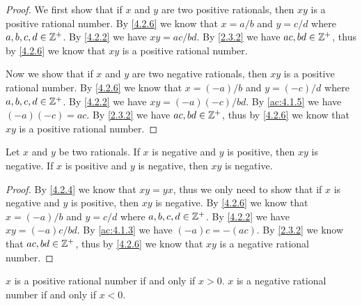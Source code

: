 \begin{proof}
  We first show that if \(x\) and \(y\) are two positive rationals, then \(xy\) is a positive rational number.
  By \cref{4.2.6} we know that \(x = a / b\) and \(y = c / d\) where \(a, b, c, d \in \mathbb{Z}^+\).
  By \cref{4.2.2} we have \(xy = ac / bd\).
  By \cref{2.3.2} we have \(ac, bd \in \mathbb{Z}^+\), thus by \cref{4.2.6} we know that \(xy\) is a positive rational number.

  Now we show that if \(x\) and \(y\) are two negative rationals, then \(xy\) is a positive rational number.
  By \cref{4.2.6} we know that \(x = (-a) / b\) and \(y = (-c) / d\) where \(a, b, c, d \in \mathbb{Z}^+\).
  By \cref{4.2.2} we have \(xy = (-a)(-c) / bd\).
  By \cref{ac:4.1.5} we have \((-a)(-c) = ac\).
  By \cref{2.3.2} we have \(ac, bd \in \mathbb{Z}^+\), thus by \cref{4.2.6} we know that \(xy\) is a positive rational number.
\end{proof}

\begin{ac}\label{ac:4.2.6}
  Let \(x\) and \(y\) be two rationals.
  If \(x\) is negative and \(y\) is positive, then \(xy\) is negative.
  If \(x\) is positive and \(y\) is negative, then \(xy\) is negative.
\end{ac}

\begin{proof}
  By \cref{4.2.4} we know that \(xy = yx\), thus we only need to show that if \(x\) is negative and \(y\) is positive, then \(xy\) is negative.
  By \cref{4.2.6} we know that \(x = (-a) / b\) and \(y = c / d\) where \(a, b, c, d \in \mathbb{Z}^+\).
  By \cref{4.2.2} we have \(xy = (-a)c / bd\).
  By \cref{ac:4.1.3} we have \((-a)c = -(ac)\).
  By \cref{2.3.2} we know that \(ac, bd \in \mathbb{Z}^+\), thus by \cref{4.2.6} we know that \(xy\) is a negative rational number.
\end{proof}

\begin{ac}\label{ac:4.2.7}
  \(x\) is a positive rational number if and only if \(x > 0\).
  \(x\) is a negative rational number if and only if \(x < 0\).
\end{ac}

